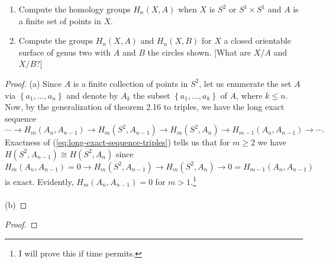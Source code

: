 \begin{problem}[Hatcher {\S}2.1, Ex.\,17]
\begin{enumerate}[label=(\alph*)]
\item Compute the homology groups $H_n(X,A)$ when $X$ is $S^2$ or
  $S^1\times S^1$ and $A$ is a finite set of points in $X$.
\item Compute the groups $H_n(X,A)$ and $H_n(X,B)$ for $X$ a closed
  orientable surface of genus two with $A$ and $B$ the circles shown. [What
  are $X/A$ and $X/B$?]
\end{enumerate}
\end{problem}
\begin{proof}
(a) Since $A$ is a finite collection of points in $S^2$, let us enumerate
the set $A$ via $\left\{ a_1,...,a_n \right\}$ and denote by $A_k$ the
subset $\left\{a_1,...,a_k\right\}$ of $A$, where $k\leq n$. Now, by the
generalization of theorem 2.16 to triples, we have the long exact sequence
\begin{equation}
\label{eq:long-exact-sequence-triples}
\cdots\longrightarrow H_m(A_n,A_{n-1})\longrightarrow
H_m(S^2,A_{n-1})\longrightarrow H_m(S^2,A_n)
\longrightarrow H_{m-1}(A_n,A_{n-1})\longrightarrow\cdots.
\end{equation}
Exactness of (\ref{eq:long-exact-sequence-triples}) tells us that for
$m\geq 2$ we have $H(S^2,A_{n-1})\cong H(S^2,A_n)$ since
\[
H_m(A_n,A_{n-1})=0\longrightarrow H_m(S^2,A_{n-1})\longrightarrow
H_m(S^2,A_n)\longrightarrow 0=H_{m-1}(A_n,A_{n-1})
\]
is exact. Evidently, $H_m(A_n,A_{n-1})=0$ for $m>1$.\footnote{I will prove
  this if time permits.}
\\\\
(b)
\end{proof}

\begin{problem}
\end{problem}
\begin{proof}
\end{proof}
\newpage

